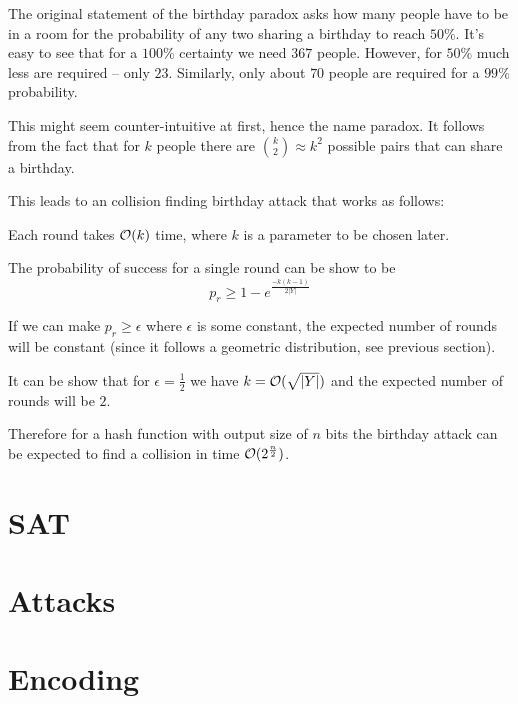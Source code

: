The original statement of the birthday paradox asks how many people have to be in a room for the probability of any two sharing a birthday to reach $50\%$. 
It's easy to see that for a $100\%$ certainty we need $367$ people. However, for $50\%$ much less are required -- only $23$. Similarly, only about $70$ people are required for a $99\%$ probability.

This might seem counter-intuitive at first, hence the name paradox.
It follows from the fact that for $k$ people there are ${k \choose 2} \approx k^2$ possible pairs that can share a birthday.

This leads to an collision finding birthday attack that works as follows:

\begin{algorithm}
\begin{algorithmic}[1]
		 
			\State {}
		\EndIf
	\EndWhile
\end{algorithmic}
\end{algorithm}

Each round takes $\mathcal{O}(k)$ time, where $k$ is a parameter to be chosen later.

The probability of success for a single round can be show to be
\[
p_r \ge 1 - e^\frac{-k(k-1)}{2|Y|}
\]

If we can make $p_r \ge \epsilon$ where $\epsilon$ is some constant, the expected number of rounds will be constant (since it follows a geometric distribution, see previous section).

It can be show that for $\epsilon = \frac{1}{2}$ we have $k = \mathcal{O}(\sqrt{|Y|})$ and the expected number of rounds will be $2$.

Therefore for a hash function with output size of $n$ bits the birthday attack can be expected to find a collision in time $\mathcal{O}(2^\frac{n}{2})$.



\chapter{SAT}


\chapter{Attacks}


\chapter{Encoding}



